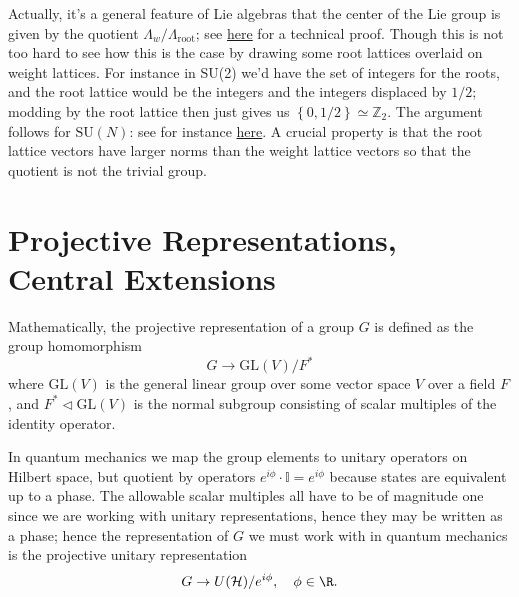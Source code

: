 \documentclass{report}
\begin{document}
Actually, it's a general feature of Lie algebras that the center of the Lie 
group is given by the quotient $ \Lambda_w / \Lambda_{\text{root}} $;
see \href{https://math.stackexchange.com/questions/1749386/relations-between-center-fundamental-group-and-coroot-and-weight-lattices-fo}{here} 
for a technical proof. Though this is not too hard to see how this is the case 
by drawing some root lattices overlaid on weight lattices. For instance in SU(2)
we'd have the set of integers for the roots, and the root lattice would be 
the integers and the integers displaced by $ 1/2 $; modding by the root lattice 
then just gives us $ \left\{0, 1/2\right\} \simeq \mathbb{Z}_2$. The argument
follows for $\text{SU}(N)$: see for instance \href{http://jde27.uk/lgla/33_classification_accessible.html}{here}. 
A crucial property is that the root lattice vectors have larger norms than the 
weight lattice vectors so that the quotient is not the trivial group.

\section{Projective Representations, Central Extensions}\label{sec:projective-reps}
Mathematically, the projective representation of a group $ G $ is defined as the group 
homomorphism 
\begin{equation*}
	G \rightarrow \text{GL}(V)/F^\ast
\end{equation*}
where $ \text{GL}(V) $ is the general linear group over some vector space 
$ V $ over a field $ F $, and $F^\ast \vartriangleleft \text{GL}(V) $ is the normal
subgroup consisting of scalar multiples of the identity operator. 

In quantum mechanics we map the group elements to unitary operators on Hilbert 
space, but quotient by operators $ e^{i\phi} \cdot \mathbb{I} = e^{i\phi} $ 
because states are equivalent up to a phase. The allowable 
scalar multiples all have to be of magnitude one since we are working with 
unitary representations, hence they may be written as a phase; hence the 
representation of $ G $ we must work with in quantum mechanics is the projective 
unitary representation 
\begin{equation*}
	G \rightarrow U(\mathcal{H})/e^{i\phi},\quad \phi\in \R.
\end{equation*}
\end{document}
